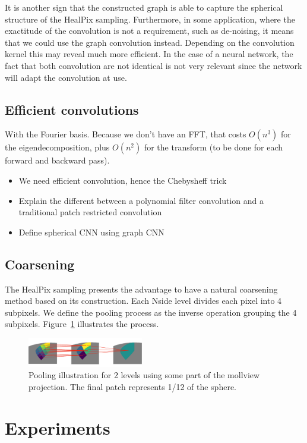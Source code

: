\documentclass[final,twocolumn,3p,times,authoryear]{elsarticle}
\newcommand{\assign}[1]{{\color[rgb]{.8,.5,.8}{Assigned: #1 }}}
\newcommand{\1}{\b{1}}              %
\newcommand{\0}{\b{0}}              %
\begin{document}
It is another sign that the constructed graph is able to capture the spherical
structure of the HealPix sampling. Furthermore, in some application, where the
exactitude of the convolution is not a requirement, such as de-noising, it means
that we could use the graph convolution instead. Depending on the convolution kernel
this may reveal much more efficient. In the case of a neural network, the fact
that both convolution are not identical is not very relevant since the network
will adapt the convolution at use.

\subsection{Efficient convolutions}
\assign{Michaël}
With the Fourier basis. Because we don't have an FFT, that costs $O(n^3)$ for the eigendecomposition, plus $O(n^2)$ for the transform (to be done for each forward and backward pass).
\begin{itemize}
	\item We need efficient convolution, hence the Chebysheff trick
	\item Explain the different between a polynomial filter convolution and a traditional patch restricted convolution
	\item Define spherical CNN using graph CNN
\end{itemize}


\subsection{Coarsening}
The HealPix sampling presents the advantage to have a natural coarsening method
based on its construction. Each Nside level divides each pixel into 4 subpixels.
We define the pooling process as the inverse operation grouping the 4 subpixels.
Figure~\ref{fig:pooling} illustrates the process.
\begin{figure}[!ht]
\centering
\includegraphics[width=0.45\textwidth]{figures/pooling.pdf}
\caption{Pooling illustration for 2 levels using some part of the mollview projection. 
The final patch represents 1/12 of the sphere.}
\label{fig:pooling}
\end{figure}


\section{Experiments}
\end{document}
